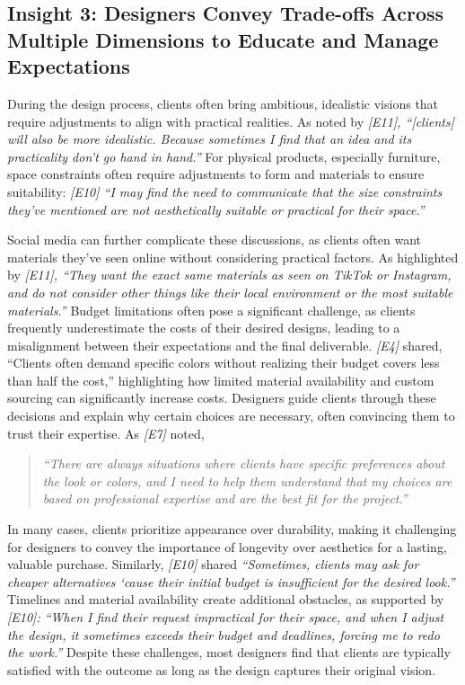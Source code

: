 \subsection{Insight 3: Designers Convey Trade-offs Across Multiple Dimensions to Educate and Manage Expectations}
During the design process, clients often bring ambitious, idealistic visions that require adjustments to align with practical realities. As noted by \textit{[E11], “[clients] will also be more idealistic. Because sometimes I find that an idea and its practicality don't go hand in hand.”} For physical products, especially furniture, space constraints often require adjustments to form and materials to ensure suitability: \textit{[E10] “I may find the need to communicate that the size constraints they’ve mentioned are not aesthetically suitable or practical for their space.”} 

Social media can further complicate these discussions, as clients often want materials they’ve seen online without considering practical factors. As highlighted by \textit{[E11], “They want the exact same materials as seen on TikTok or Instagram, and do not consider other things like their local environment or the most suitable materials.”} Budget limitations often pose a significant challenge, as clients frequently underestimate the costs of their desired designs, leading to a misalignment between their expectations and the final deliverable. \textit{[E4]} shared, “Clients often demand specific colors without realizing their budget covers less than half the cost,” highlighting how limited material availability and custom sourcing can significantly increase costs. Designers guide clients through these decisions and explain why certain choices are necessary, often convincing them to trust their expertise. As \textit{[E7]} noted, \begin{quote}\textit{“There are always situations where clients have specific preferences about the look or colors, and I need to help them understand that my choices are based on professional expertise and are the best fit for the project.”}\end{quote} 

In many cases, clients prioritize appearance over durability, making it challenging for designers to convey the importance of longevity over aesthetics for a lasting, valuable purchase. Similarly, \textit{[E10]} shared \textit{“Sometimes, clients may ask for cheaper alternatives ‘cause their initial budget is insufficient for the desired look.”} Timelines and material availability create additional obstacles, as supported by \textit{[E10]: “When I find their request impractical for their space, and when I adjust the design, it sometimes exceeds their budget and deadlines, forcing me to redo the work.”} Despite these challenges, most designers find that clients are typically satisfied with the outcome as long as the design captures their original vision.